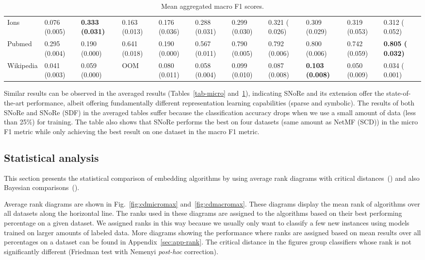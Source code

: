 \documentclass[twoside,11pt]{article}
\begin{document}
\begin{table}[htb!]
{\begin{tabular}{lllllllllll}
Ions               &  0.076 (0.005) &\bfseries  0.333 (0.031) &  0.163 (0.013) &  0.176 (0.036) &  0.288 (0.031) &   0.299 (0.030) &   0.321 ( 0.026) &  0.309 (0.029) &  0.319 (0.053) &  0.312 ( 0.052)\\
Pubmed             &  0.295 (0.004) &     0.190 (0.000) &  0.641 (0.018) &     0.190 (0.000) &  0.567 (0.011) &   0.790 (0.005) &  0.792 (0.006) &    0.800 (0.006) &  0.742 (0.059) &\bfseries  0.805 ( 0.032)\\
Wikipedia          &  0.041 (0.003) &    0.059 (0.000) &              OOM &   0.080 (0.011) &  0.058 (0.004) &   0.099 (0.010) &  0.087 (0.008) &\bfseries  0.103 (0.008) &   0.050 (0.009) &  0.034 ( 0.001)\\
\bottomrule
\end{tabular}
} 	\caption{Mean aggregated macro F1 scores.}
	\label{tab-macro}
\end{table}

Similar results can be observed in the averaged results (Tables~\ref{tab-micro} and~\ref{tab-macro}), indicating SNoRe and its extension offer the state-of-the-art performance, albeit offering fundamentally different representation learning capabilities (sparse and symbolic). The results of both SNoRe and SNoRe (SDF) in the averaged tables suffer because the classification accuracy drops when we use a small amount of data (less than 25\%) for training. The table also shows that SNoRe performs the best on four datasets (same amount as NetMF (SCD)) in the micro F1 metric while only achieving the best result on one dataset in the macro F1 metric.

\subsection{Statistical analysis}
\label{sec:statistical}
This section presents the statistical comparison of embedding algorithms by using average rank diagrams with critical distances~(\cite{demsar2006statistical}) and also Bayesian comparisons~(\cite{benavoli2017bayes}).

Average rank diagrams are shown in Fig.~\ref{fig:cdmicromax} and~\ref{fig:cdmacromax}. These diagrams display the mean rank of algorithms over all datasets along the horizontal line. The ranks used in these diagrams are assigned to the algorithms based on their best performing percentage on a given dataset. We assigned ranks in this way because we usually only want to classify a few new instances using models trained on larger amounts of labeled data. More diagrams showing the performance where ranks are assigned based on mean results over all percentages on a dataset can be found in Appendix~\ref{sec:app-rank}. The critical distance in the figures group classifiers whose rank is not significantly different (Friedman test with Nemenyi \emph{post-hoc} correction).
\end{document}
